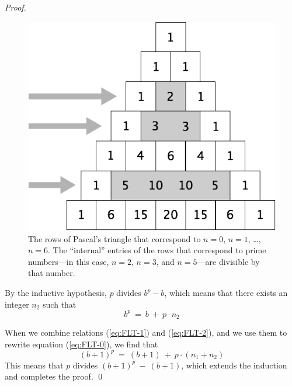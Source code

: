 \begin{proof}
\begin{figure}[ht]
\begin{center}
  \includegraphics[scale=0.3]{FiguresArithmetic/TrianglePascalPrimes.png}
\caption{The rows of Pascal's triangle that correspond to $n=0$, $n=1$, \ldots, $n=6$.  The ``internal'' entries of the rows that correspond to prime numbers---in this case, $n=2$, $n=3$, and $n=5$---are divisible by that number.}
\label{fig:TrianglePrime}
\end{center}
\end{figure}

By the inductive hypothesis, $p$ divides $b^p -b$, which means that there exists an integer $n_2$ such that
\begin{equation}
\label{eq:FLT-2}
 b^p \ = \ b \ + \ p \cdot n_2
\end{equation}

\smallskip

When we combine relations (\ref{eq:FLT-1}) and (\ref{eq:FLT-2}), and we use them to rewrite equation (\ref{eq:FLT-0}), we find that
\[
(b+1)^p \ = \ (b + 1) \ + \ p \cdot (n_1 + n_2)
\]
This means that $p$ divides $(b+1)^p \ - \ (b + 1)$, which extends the induction and completes the proof.  \qed
\end{proof}

